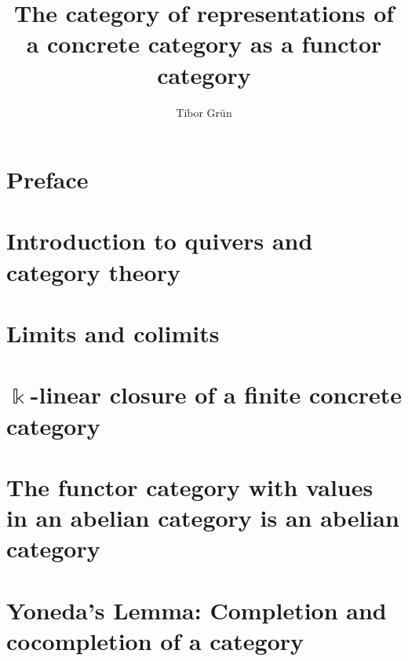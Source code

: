 \documentclass{article}
\title{The category of representations of a concrete category as a functor category}
\author{Tibor Gr{\"u}n}
\begin{document}

	\maketitle

	\newpage

	\tableofcontents\label{toc}
	
	\newpage

	
\section*{Preface}

\section{Introduction to quivers and category theory}


\section{Limits and colimits}


\section{$\Bbbk$-linear closure of a finite concrete category}


%

\section{The functor category with values in an abelian category is an abelian category}


\section{Yoneda's Lemma: Completion and cocompletion of a category}

\end{document}
